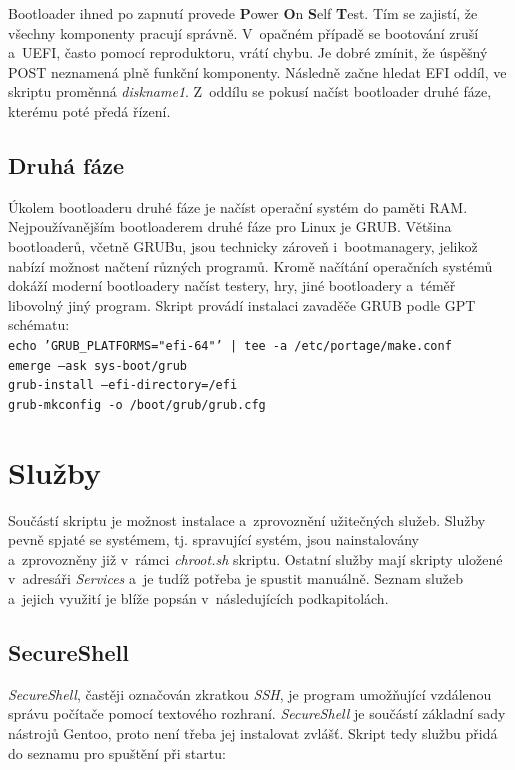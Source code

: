 \documentclass[12pt,a4paper,twoside,]{article}
\begin{document}
{{{{{{\hspace{-1.5em}Bootloader ihned po zapnutí provede {\bf P}ower {\bf O}n {\bf S}elf {\bf T}est. Tím se zajistí, že všechny komponenty pracují správně. V~opačném případě se bootování zruší a~UEFI, často pomocí reproduktoru, vrátí chybu. Je dobré zmínit, že úspěšný POST neznamená plně funkční komponenty. Následně začne hledat EFI oddíl, ve skriptu proměnná \textit{diskname1}. Z~oddílu se pokusí načíst bootloader druhé fáze, kterému poté předá řízení.

\subsection{\textsf{Druhá fáze}}
Úkolem bootloaderu druhé fáze je načíst operační systém do paměti RAM. Nejpoužívanějším bootloaderem druhé fáze pro Linux je GRUB. Většina bootloaderů, včetně GRUBu, jsou technicky zároveň i~bootmanagery, jelikož nabízí možnost načtení různých programů. Kromě načítání operačních systémů dokáží moderní bootloadery načíst testery, hry, jiné bootloadery a~téměř libovolný jiný program. Skript provádí instalaci zavaděče GRUB podle GPT schématu:\\

\texttt{echo 'GRUB\_PLATFORMS="efi-64"' | tee -a /etc/portage/make.conf}\\
\hspace*{1.5em}\texttt{emerge --ask sys-boot/grub}\\
\hspace*{1.5em}\texttt{grub-install --efi-directory=/efi}\\
\hspace*{1.5em}\texttt{grub-mkconfig -o /boot/grub/grub.cfg}\\

\newpage
\section{\textsf{Služby}}
Součástí skriptu je možnost instalace a~zprovoznění užitečných služeb. Služby pevně spjaté se systémem, tj. spravující systém, jsou nainstalovány a~zprovozněny již v~rámci \textit{chroot.sh} skriptu. Ostatní služby mají skripty uložené v~adresáři \textit{Services} a~je tudíž potřeba je spustit manuálně. Seznam služeb a~jejich využití je blíže popsán v~následujících podkapitolách. 

\subsection{\textsf{SecureShell}}
\textit{SecureShell}, častěji označován zkratkou \textit{SSH}, je program umožňující vzdálenou správu počítače pomocí textového rozhraní. \textit{SecureShell} je součástí základní sady nástrojů Gentoo, proto není třeba jej instalovat zvlášť. Skript tedy službu přidá do seznamu pro spuštění při startu: 

}}}}}}
\end{document}
